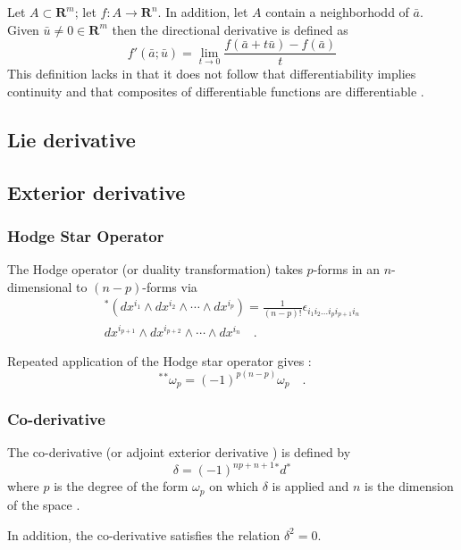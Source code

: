 \documentclass[twocolumn]{article}
\def\.{{\quad .}}
\begin{document}
Let $A \subset \mathbf{R}^{m}$; let $f: A \rightarrow \mathbf{R}^{n}$.
In addition, let $A$ contain a neighborhodd of $\bar a$.  Given
$\bar u \neq 0 \in \mathbf{R}^{m}$ then the directional derivative is 
defined as
\[
  f'(\bar a; \bar u) = \lim_{t \rightarrow 0} 
  \frac{f(\bar a + t \bar u) - f(\bar a)}{t}
\]
This definition lacks in that it does not follow that 
differentiability implies continuity and that composites of 
differentiable functions are differentiable \cite{munkres}. 

\subsection{Lie derivative}\label{SS:Lie_deriv}

\subsection{Exterior derivative}\label{SS:ext_deriv}

\subsubsection{Hodge Star Operator}\label{SSS:hodge}

The Hodge operator (or duality transformation) takes $p$-forms in an
$n$-dimensional to $(n-p)$-forms via
\begin{eqnarray*}
  {}^{\ast} \left( dx^{i_1} \wedge dx^{i_2} \wedge \cdots 
                            \wedge dx^{i_p} \right)  = 
					   \frac{1}{(n-p)!} 
					   \epsilon_{i_1 i_2 \ldots i_p i_{p+1} i_n} 
\\ 
  dx^{i_{p+1}} \wedge dx^{i_{p+2}} \wedge \cdots \wedge dx^{i_n} \.
\end{eqnarray*}

Repeated application of the Hodge star operator gives \cite{ryder}:
\[
  {}^{\ast} {}^{\ast} \omega_p = (-1)^{p(n-p)} \omega_p \. 
\]

\subsubsection{Co-derivative}\label{SSS:co_deriv}

The co-derivative (or adjoint exterior derivative \cite{ryder})
is defined by 
\[
  \delta = (-1)^{np+n+1} {}^{\ast} d {}^{\ast}
\]
where $p$ is the degree of the form $\omega_p$ on which $\delta$ is 
applied and $n$ is the dimension of the space \cite{ryder}.

In addition, the co-derivative satisfies the relation 
$\delta^2 = 0$\cite{ryder}.
 
\end{document}
